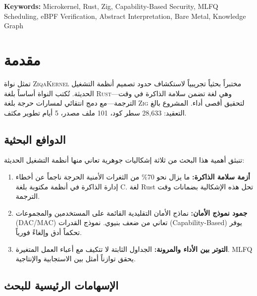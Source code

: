 \documentclass[12pt,a4paper]{article}
\theoremstyle{definition}
\newcommand{\en}[1]{\textenglish{#1}}
\begin{document}
\noindent\textbf{Keywords:}
\en{Microkernel}, Rust, Zig, \en{Capability-Based} Security, \en{MLFQ} Scheduling,
eBPF Verification, \en{Abstract Interpretation}, Bare Metal, Knowledge Graph

\newpage
\tableofcontents
\newpage

\section{مقدمة}

تمثل نواة \textsc{ZiqaKernel} مختبراً بحثياً تجريبياً لاستكشاف حدود تصميم أنظمة التشغيل الحديثة. تُكتب النواة أساساً بلغة \textsc{Rust}---وهي لغة تضمن سلامة الذاكرة في وقت الترجمة---مع دمج انتقائي لمسارات حرجة بلغة \textsc{Zig} لتحقيق أقصى أداء. المشروع بالغ التعقيد: 28,633 سطر كود، 101 ملف مصدر، 5 أيام تطوير مكثف.

\subsection{الدوافع البحثية}

تنبثق أهمية هذا البحث من ثلاثة إشكاليات جوهرية تعاني منها أنظمة التشغيل الحديثة:

\begin{enumerate}[label=\arabic*., leftmargin=2em]
\item \textbf{أزمة سلامة الذاكرة:} ما يزال نحو \en{70\%} من الثغرات الأمنية الحرجة ناجماً عن أخطاء إدارة الذاكرة في أنظمة مكتوبة بلغة C. لغة Rust تحل هذه الإشكالية بضمانات وقت الترجمة.
\item \textbf{جمود نموذج الأمان:} نماذج الأمان التقليدية القائمة على المستخدمين والمجموعات (DAC/MAC) تعاني من ضعف بنيوي. نموذج القدرات (\en{Capability-Based}) يوفر تحكماً أدق وإلغاءً فورياً.
\item \textbf{التوتر بين الأداء والمرونة:} الجداول الثابتة لا تتكيف مع أعباء العمل المتغيرة. \en{MLFQ} يحقق توازناً أمثل بين الاستجابية والإنتاجية.
\end{enumerate}

\subsection{الإسهامات الرئيسية للبحث}
\end{document}
